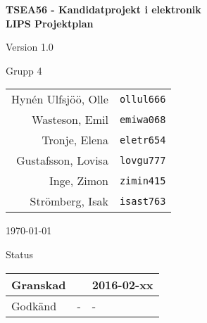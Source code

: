 \documentclass[11pt]{article}
\begin{document}
\begin{titlepage}
\begin{center}

{\Large\bfseries TSEA56 - Kandidatprojekt i elektronik \\ LIPS Projektplan}

\vspace{5em}

Version 1.0

\vspace{5em}
Grupp 4 \\
\begin{tabular}{rl}
Hynén Ulfsjöö, Olle&\verb+ollul666+
\\
Wasteson, Emil&\verb+emiwa068+
\\
Tronje, Elena&\verb+eletr654+
\\
Gustafsson, Lovisa&\verb+lovgu777+
\\
Inge, Zimon&\verb+zimin415+
\\
Strömberg, Isak&\verb+isast763+
\\
\end{tabular}

\vspace{5em}
\today

\vspace{16em}
Status
\begin{longtable}{|l|l|l|} \hline

Granskad &  & 2016-02-xx \\ \hline
Godkänd & - & - \\ \hline
 
\end{longtable}

\end{center}
\end{titlepage}
\end{document}
